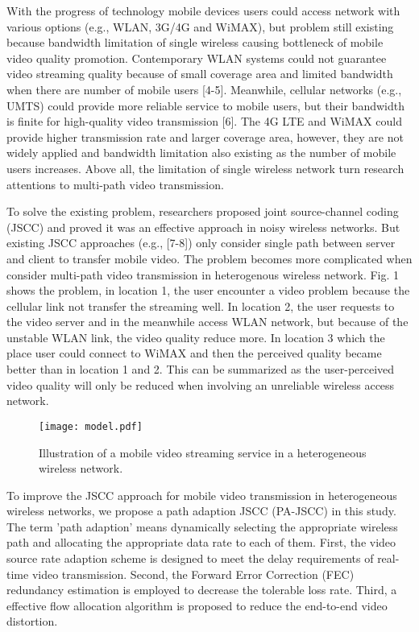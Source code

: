 \documentclass[journal]{IEEEtran}
\begin{document}
With the progress of technology mobile devices users could access network with various options (e.g., WLAN, 3G/4G and WiMAX), but problem still existing because bandwidth limitation of single wireless causing bottleneck of mobile video quality promotion. Contemporary WLAN systems could not guarantee video streaming quality because of small coverage area and limited bandwidth when there are number of mobile users [4-5]. Meanwhile, cellular networks (e.g., UMTS) could provide more reliable service to mobile users, but their bandwidth is finite for high-quality video transmission [6]. The 4G LTE and WiMAX could provide higher transmission rate and larger coverage area, however, they are not widely applied and bandwidth limitation also existing as the number of mobile users increases. Above all, the limitation of single wireless network turn research attentions to multi-path video transmission.

To solve the existing problem, researchers proposed joint source-channel coding (JSCC) and proved it was an effective approach in noisy wireless networks. But existing JSCC approaches (e.g., [7-8]) only consider single path between server and client to transfer mobile video. The problem becomes more complicated when consider multi-path video transmission in heterogenous wireless network. Fig. 1 shows the problem, in location 1, the user encounter a video problem because the cellular link not transfer the streaming well. In location 2, the user requests to the video server and in the meanwhile access WLAN network, but because of the unstable WLAN link, the video quality reduce more. In location 3 which the place user could connect to WiMAX and then the perceived quality became better than in location 1 and 2. This can be summarized as the user-perceived video quality will only be reduced when involving an unreliable wireless access network.

\begin{figure}
\centering
 \texttt{[image: model.pdf]}
\caption{Illustration of a mobile video streaming service in a heterogeneous wireless network.}\label{fig1}
 \vspace{-5pt}
\end{figure}
To improve the JSCC approach for mobile video transmission in heterogeneous wireless networks, we propose a path adaption JSCC (PA-JSCC) in this study. The term 'path adaption' means dynamically selecting the appropriate wireless path and allocating the appropriate data rate to each of them. First, the video source rate adaption scheme is designed to meet the delay requirements of real-time video transmission. Second, the Forward Error Correction (FEC) redundancy estimation is employed to decrease the tolerable loss rate. Third, a effective flow allocation algorithm is proposed to reduce the end-to-end video distortion.
\end{document}
